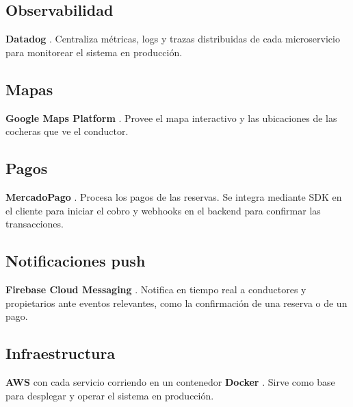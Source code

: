 \subsection{Observabilidad}
\textbf{Datadog} \autocite{datadog}. Centraliza métricas, logs y trazas distribuidas de cada microservicio para monitorear el sistema en producción.

\subsection{Mapas}
\textbf{Google Maps Platform} \autocite{googlemapsplatform}. Provee el mapa interactivo y las ubicaciones de las cocheras que ve el conductor.

\subsection{Pagos}
\textbf{MercadoPago} \autocite{mercadopago}. Procesa los pagos de las reservas. Se integra mediante SDK en el cliente para iniciar el cobro y webhooks en el backend para confirmar las transacciones.

\subsection{Notificaciones push}
\textbf{Firebase Cloud Messaging} \autocite{firebase}. Notifica en tiempo real a conductores y propietarios ante eventos relevantes, como la confirmación de una reserva o de un pago.

\subsection{Infraestructura}
\textbf{AWS} \autocite{aws} con cada servicio corriendo en un contenedor \textbf{Docker} \autocite{docker}. Sirve como base para desplegar y operar el sistema en producción.
